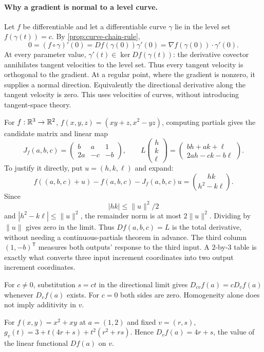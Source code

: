 \paragraph{Why a gradient is normal to a level curve.}
Let $f$ be differentiable and let a differentiable curve $\gamma$ lie in
the level set $f(\gamma(t))=c$. By \cref{prop:curve-chain-rule},
\[
0=(f\circ\gamma)'(0)=Df(\gamma(0))\gamma'(0)
=\nabla f(\gamma(0))\cdot\gamma'(0).
\]
At every parameter value, $\gamma'(t)\in\ker Df(\gamma(t))$:
the derivative covector annihilates tangent velocities to the level set.
Thus every tangent velocity is orthogonal to the gradient. At a regular
point, where the gradient is nonzero, it supplies a normal direction.
Equivalently the directional derivative along the tangent velocity is zero.
This uses velocities of curves, without introducing tangent-space theory.

\begin{example}
For $f:\mathbb{R}^3\to\mathbb{R}^2$, $f(x,y,z)=(xy+z,x^2-yz)$, computing partials
gives the candidate matrix and linear map
\[
J_f(a,b,c)=\begin{pmatrix}b&a&1\\2a&-c&-b\end{pmatrix},\qquad
L\begin{pmatrix}h\\k\\\ell\end{pmatrix}
=\begin{pmatrix}bh+ak+\ell\\2ah-ck-b\ell\end{pmatrix}.
\]
To justify it directly, put $u=(h,k,\ell)$ and expand:
\[
f((a,b,c)+u)-f(a,b,c)-J_f(a,b,c)u
=\binom{hk}{h^2-k\ell}.
\]
Since
\[
|hk|\leq\|u\|^2/2
\]
 and
$|h^2-k\ell|\leq\|u\|^2$, the remainder norm is at most
$2\|u\|^2$. Dividing by $\|u\|$ gives zero in the limit.
Thus $Df(a,b,c)=L$ is the total derivative, without needing a
continuous-partials theorem in advance.
The third column $(1,-b)^{\mathsf T}$ measures both outputs' response to
the third input. A $2$-by-$3$ table is exactly what converts three input
increment coordinates into two output increment coordinates.
\end{example}


For $c\ne0$, substitution $s=ct$ in the directional limit gives
$D_{cv}f(a)=cD_vf(a)$ whenever $D_vf(a)$ exists. For $c=0$ both sides
are zero. Homogeneity alone does not imply additivity in $v$.
\begin{example}
For $f(x,y)=x^2+xy$ at $a=(1,2)$ and fixed $v=(r,s)$,
$g_v(t)=3+t(4r+s)+t^2(r^2+rs)$. Hence $D_vf(a)=4r+s$,
the value of the linear functional $Df(a)$ on $v$.
\end{example}

